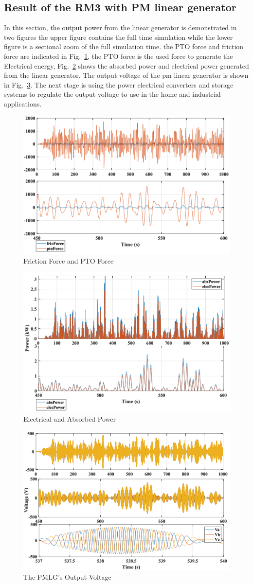 \documentclass[conference]{IEEEtran}
\begin{document}
\subsection{Result of the RM3 with PM linear generator}
In this section, the output power from the linear generator is demonstrated in two figures the upper figure contains the full time simulation while the lower figure is a sectional zoom of the full simulation time. the PTO force and friction force are indicated in Fig.~\ref{Frfr}, the PTO force is the used force to generate the Electrical energy, Fig.~\ref{Abpwr} shows the absorbed power and electrical power generated from the linear generator. The output voltage of the pm linear generator is shown in Fig.~\ref{vpm}. The next stage is using the power electrical converters and storage systems to regulate the output voltage to use in the home and industrial applications.


\begin{figure}[htbp]
	\centerline{\includegraphics[width=3.3 in]{fig/9.png}}
	\caption{ Friction Force and PTO Force  }
	\label{Frfr}
\end{figure}
\begin{figure}[htbp]
	\centerline{\includegraphics[width=3.3 in]{fig/10.png}}
	\caption{ Electrical and Absorbed Power }
	\label{Abpwr}
\end{figure}
\begin{figure}[htbp]
	\centerline{\includegraphics[width=3.3 in]{fig/11.png}}
	\caption{ The PMLG's Output Voltage }
	\label{vpm}
\end{figure}
\end{document}
